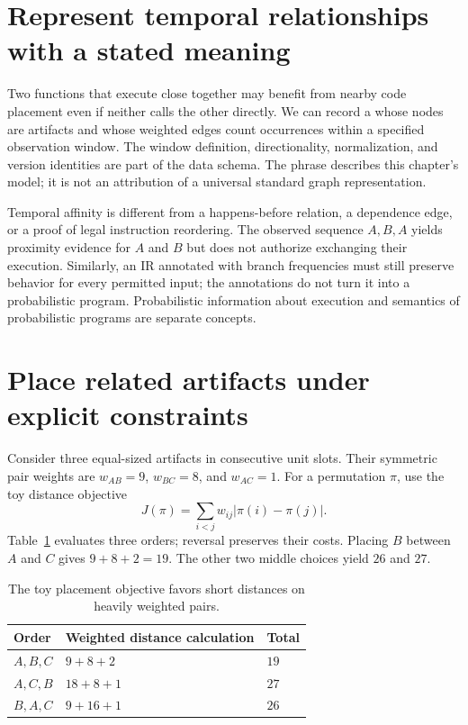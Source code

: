 \section{Represent temporal relationships with a stated meaning}
\label{sec:ch68-temporal}

Two functions that execute close together may benefit from nearby code placement even if neither calls the other directly.
We can record a  whose nodes are artifacts and whose weighted edges count occurrences within a specified observation window.
The window definition, directionality, normalization, and version identities are part of the data schema.
The phrase describes this chapter's model; it is not an attribution of a universal standard graph representation.

Temporal affinity is different from a happens-before relation, a dependence edge, or a proof of legal instruction reordering.
The observed sequence $A,B,A$ yields proximity evidence for $A$ and $B$ but does not authorize exchanging their execution.
Similarly, an IR annotated with branch frequencies must still preserve behavior for every permitted input; the annotations do not turn it into a probabilistic program.
Probabilistic information about execution and semantics of probabilistic programs are separate concepts.

\section{Place related artifacts under explicit constraints}
\label{sec:ch68-placement}

Consider three equal-sized artifacts in consecutive unit slots.
Their symmetric pair weights are $w_{AB}=9$, $w_{BC}=8$, and $w_{AC}=1$.
For a permutation $\pi$, use the toy distance objective
\[
J(\pi)=\sum_{i<j}w_{ij}|\pi(i)-\pi(j)|.
\]
Table~\ref{tab:ch68-placement} evaluates three orders; reversal preserves their costs.
Placing $B$ between $A$ and $C$ gives $9+8+2=19$.
The other two middle choices yield $26$ and $27$.

\begin{table}[htbp]
\caption{The toy placement objective favors short distances on heavily weighted pairs.}
\label{tab:ch68-placement}
\centering
\begin{tabular}{lll}
\toprule
Order & Weighted distance calculation & Total \\
\midrule
$A,B,C$ & $9+8+2$ & $19$ \\
$A,C,B$ & $18+8+1$ & $27$ \\
$B,A,C$ & $9+16+1$ & $26$ \\
\bottomrule
\end{tabular}
\end{table}

